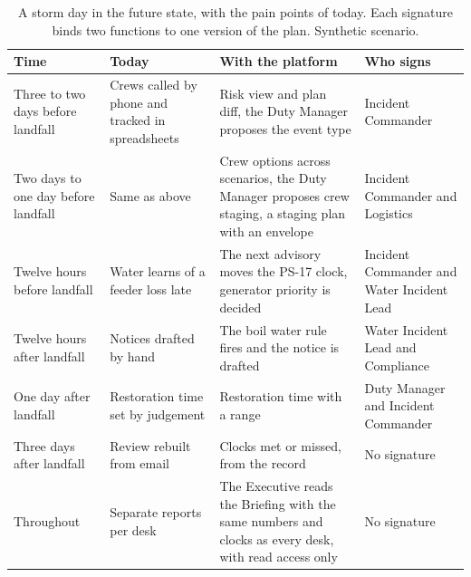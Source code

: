 \documentclass[fontsize=10pt,a4paper,DIV=12,parskip=half-,numbers=noenddot,headsepline,captions=tableheading]{scrartcl}
\begin{document}
\begin{table}[tb]\footnotesize
\caption{A storm day in the future state, with the pain points of today. Each signature binds two functions to one version of the plan. Synthetic scenario.}\label{tab:stormday}
\begin{tabularx}{\textwidth}{@{}L{2.9cm} L{3.3cm} Y L{3.4cm}@{}}
  \toprule
  \textbf{Time} & \textbf{Today} & \textbf{With the platform} & \textbf{Who signs} \\ \midrule
  Three to two days before landfall & Crews called by phone and tracked in spreadsheets & Risk view and plan diff, the Duty Manager proposes the event type & Incident Commander \\
  Two days to one day before landfall & Same as above & Crew options across scenarios, the Duty Manager proposes crew staging, a staging plan with an envelope & Incident Commander and Logistics \\
  Twelve hours before landfall & Water learns of a feeder loss late & The next advisory moves the PS-17 clock, generator priority is decided & Incident Commander and Water Incident Lead \\
  Twelve hours after landfall & Notices drafted by hand & The boil water rule fires and the notice is drafted & Water Incident Lead and Compliance \\
  One day after landfall & Restoration time set by judgement & Restoration time with a range & Duty Manager and Incident Commander \\
  Three days after landfall & Review rebuilt from email & Clocks met or missed, from the record & No signature \\
  Throughout & Separate reports per desk & The Executive reads the Briefing with the same numbers and clocks as every desk, with read access only & No signature \\
  \bottomrule
\end{tabularx}
\end{table}
\end{document}
